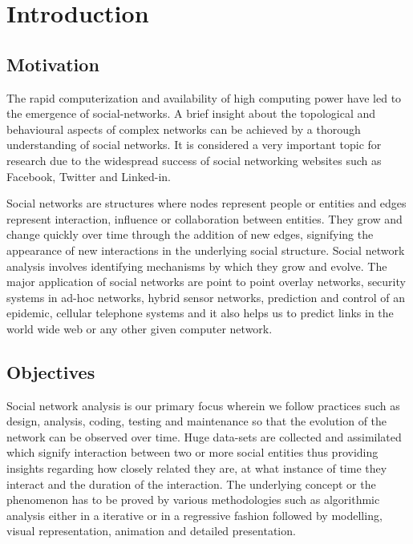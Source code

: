 \chapter{Introduction}
\ifpdf
    \graphicspath{{Introduction/IntroductionFigs/PNG/}{Introduction/IntroductionFigs/PDF/}{Introduction/IntroductionFigs/}}
\else
    \graphicspath{{Introduction/IntroductionFigs/EPS/}{Introduction/IntroductionFigs/}}
\fi


\section{Motivation}
The rapid computerization and availability of high computing power have led to the emergence of social-networks.
A brief insight about the topological and behavioural aspects of complex networks can be achieved by a thorough
understanding of social networks. It is considered a very important topic for research due to the widespread
success of social networking websites such as Facebook, Twitter and Linked-in.

Social networks are structures where nodes represent people or entities and edges represent interaction,
influence or collaboration between entities. They grow and change quickly over time through the addition of
new edges, signifying the appearance of new interactions in the underlying social structure. Social network
analysis involves identifying mechanisms by which they grow and evolve. The major application of social
networks are point to point overlay networks, security systems in ad-hoc networks, hybrid sensor networks,
prediction and control of an epidemic, cellular telephone systems and it also helps us to predict links
in the world wide web or any other given computer network.

\section{Objectives}
Social network analysis is our primary focus wherein we follow practices such as design, analysis, coding,
testing and maintenance so that the evolution of the network can be observed over time. Huge data-sets are
collected and assimilated which signify interaction between two or more social entities thus providing insights
regarding how closely related they are, at what instance of time they interact and the duration of the
interaction. The underlying concept or the phenomenon has to be proved by various methodologies such as
algorithmic analysis either in a iterative or in a regressive fashion followed by modelling, visual representation,
animation and detailed presentation.

